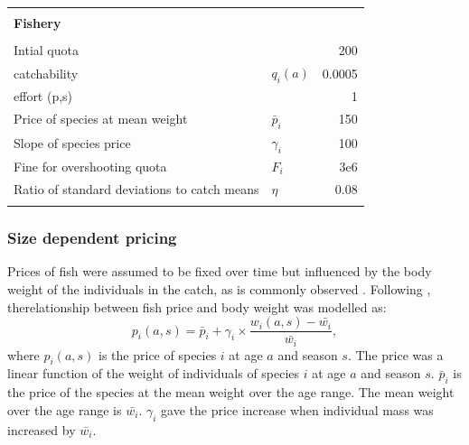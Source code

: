 \documentclass[12pt,oneline,a4paper,numbib]{ouparticle}
\numberwithin{equation}{subsection} %
\begin{document}
\begin{table}[!h]
{\begin{tabular}{@{}llr@{}}
&                 \\  
\textbf{Fishery }                                                      &             \\ \hline   
&  \\%

Intial quota                                                               &                       & 200 \\%
catchability                                                               & $q_i (a)$        & 0.0005        \\ 
effort (p,s)                                                               &                       & 1                 \\ 
Price of species at mean weight                               & $\bar{p}_i$   & 150             \\
Slope of species price                                              & $\gamma_i$   &  100            \\
Fine for overshooting quota                                    &  $F_i$            & 3e6              \\
Ratio of standard deviations to catch means          & $\eta$           & 0.08           \\ 
&                 \\  \hline%
\end{tabular}
}
\end{table}

\subsubsection{Size dependent pricing}
\label{sec2.2.1}
Prices of fish were assumed to be fixed over time but influenced by the body weight of the individuals in the catch, as is commonly observed \cite{Zimmermann2011, Zimmermann2013}. Following \cite{Zimmermann2011}, therelationship between fish price and body weight was modelled as:  
\begin{equation}
 p_i (a,s) = \bar{ p}_i + \gamma_i \times \frac{w_i (a,s) -\bar{w_i}}{\bar{w_i}},
\end{equation}
where $p_i (a,s) $ is the price of species $i$ at age $a$ and season $s$. The price was a linear function of the weight of individuals of species $i$ at age $a$ and season $s$. $\bar{p}_i$ is the price of the species at the mean weight over the age range. The mean weight over the age range is $\bar{w_i}$. $\gamma_i$ gave the price increase when individual mass was increased by $\bar{w_i}$. 
\end{document}
